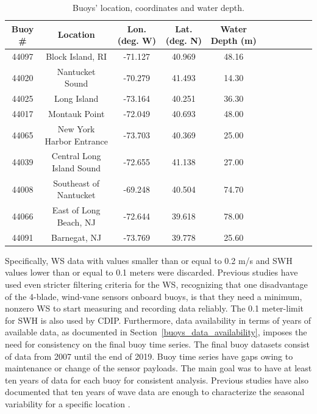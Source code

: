\begin{table}[H]
\begin{tabular*}{\textwidth}{c@{\hskip 0.25in}ccccc @{\extracolsep{\fill}} ccccc}
\toprule
 Buoy \# &                    Location &  Lon. (deg. W) &  Lat. (deg. N) &  
 Water Depth (m) \\
\midrule
  44097 &           Block Island, RI  &    -71.127 &    40.969 &        48.16 \\
  44020 &             Nantucket Sound &    -70.279 &    41.493 &        14.30 \\
  44025 &                 Long Island &    -73.164 &    40.251 &        36.30 \\
  44017 &               Montauk Point &    -72.049 &    40.693 &        48.00 \\
  44065 &    New York Harbor Entrance &    -73.703 &    40.369 &        25.00 \\
  44039 &   Central Long Island Sound &    -72.655 &    41.138 &        27.00 \\
  44008 &      Southeast of Nantucket &    -69.248 &    40.504 &        74.70 \\
  44066 &      East of Long Beach, NJ &    -72.644 &    39.618 &        78.00 \\
  44091 &                Barnegat, NJ &    -73.769 &    39.778 &        25.60 \\
  \bottomrule
\end{tabular*}
\caption {Buoys' location, coordinates and water depth.}
\label{buoys_location}
\end{table}


 Specifically, WS data with values smaller than or equal to 0.2 m/s and SWH values lower than or equal to 0.1 meters were discarded. Previous studies \cite{Andreas2012} have used even stricter filtering criteria for the WS, recognizing that one disadvantage of the 4-blade, wind-vane sensors onboard buoys, is that they need a minimum, nonzero WS to start measuring and recording data reliably. The 0.1 meter-limit for SWH is also used by CDIP. Furthermore, data availability in terms of years of available data, as documented in Section~\ref{buoys_data_availability}, imposes the need for consistency on the final buoy time series. The final buoy datasets consist of data from 2007 until the end of 2019. Buoy time series have gaps owing to maintenance or change of the sensor payloads. The main goal was to have at least ten years of data for each buoy for consistent analysis. Previous studies have also documented that ten years of wave data are enough to characterize the seasonal variability for a specific location \cite{athanas1995}.
 
